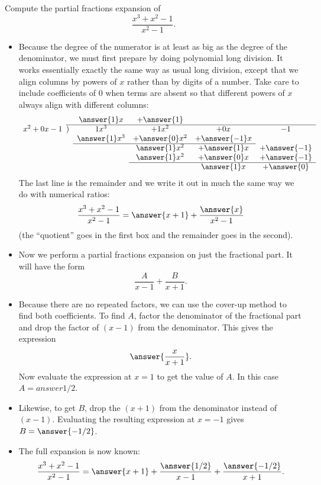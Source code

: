 \documentclass{ximera}
\begin{document}
\begin{example}
Compute the partial fractions expansion of
\[ \frac{x^3 + x^2 -1}{x^2-1}. \]
\begin{itemize}
\item Because the degree of the numerator is at least as big as the degree of the denominator, we must first prepare by doing polynomial long division. It works essentially exactly the same way as usual long division, except that we align columns by powers of $x$ rather than by digits of a number. Take care to include coefficients of $0$ when terms are absent so that different powers of $x$ always align with different columns:
\[ 
\begin{array}{r@{\hskip\arraycolsep}lcccc}
 && \answer{1}x & + \answer{1} & & \\
\cline{2-6}
x^2 + 0 x - 1 &)& 1 x^3 & + 1 x^2 & + 0 x & -1 \\
 && \answer{1} x^3 & + \answer{0} x^2 & + \answer{-1} x &  \\
 \cline{3-5} 
  && & \answer{1} x^2 & + \answer{1} x & + \answer{-1} \\
  && & \answer{1} x^2 & + \answer{0} x & + \answer{-1} \\
  \cline{4-6}
  && &  & \answer{1} x & + \answer{0}
\end{array}
\]
The last line is the remainder and we write it out in much the same way we do with numerical ratios:
\[ \frac{x^3 + x^2 - 1}{x^2 - 1} = \answer{ x + 1} + \frac{\answer{x}}{x^2-1} \]
(the ``quotient'' goes in the first box and the remainder goes in the second).
\item Now we perform a partial fractions expansion on just the fractional part.  It will have the form
\[ \frac{A}{x-1} + \frac{B}{x+1}. \]
\item Because there are no repeated factors, we can use the cover-up method to find both coefficients.  To find $A$, factor the denominator of the fractional part and drop the factor of $(x-1)$ from the denominator. This gives the expression
\[ \answer{\frac{x}{x+1}}. \]
Now evaluate the expression at $x = 1$ to get the value of $A$. In this case $A = answer{1/2}$.
\item Likewise, to get $B$, drop the $(x+1)$ from the denominator instead of $(x-1)$. Evaluating the resulting expression at $x = -1$ gives $B = \answer{-1/2}$.  
\item The full expansion is now known:
\[ \frac{x^3+x^2-1}{x^2-1} = \answer{x+1} + \frac{\answer{1/2}}{x-1} + \frac{\answer{-1/2}}{x+1}. \]
\end{itemize}
\end{example}
\end{document}
